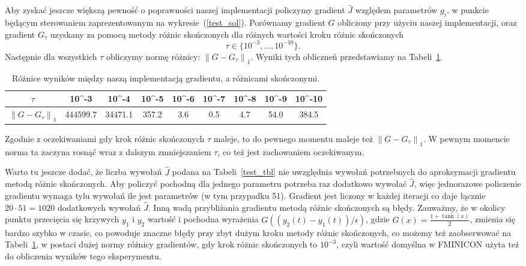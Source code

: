 \documentclass[11pt]{article}
\newcommand{\norm}[1]{\left\lVert#1\right\rVert}
\begin{document}
Aby zyskać jeszcze większą pewność o poprawności naszej implementacji policzymy gradient $\hat{J}$ względem parametrów $g_i$, w punkcie będącym sterowaniem zaprezentowanym na wykresie~(\ref{test_sol}). Porównamy gradient $G$ obliczony przy użyciu naszej implementacji, oraz gradient $G_\tau$ uzyskany za pomocą metody różnic skończonych dla różnych wartości kroku różnic skończonych
\[\tau \in \{10^{-3},\ldots,10^{-10}\}.\]
Następnie dla wszystkich $\tau$ obliczymy normę różnicy: $\norm{G - G_\tau}_1$. Wyniki tych obliczneń przedstawiamy na Tabeli~\ref{grad_fd_tbl}.

\begin{table}[h!]
  \begin{center}
    \begin{tabular}{|c|c|c|c|c|c|c|c|c|}
      \hline
      $\tau$ & 10^{-3} & 10^{-4} & 10^{-5} & 10^{-6} & 10^{-7} & 10^{-8} & 10^{-9} & 10^{-10} \\
      \hline
      $\norm{G - G_\tau}_1$ & 444599.7 & 34471.1 & 357.2 & 3.6 & 0.5 & 4.7 & 54.0 & 384.5 \\
      \hline
    \end{tabular}
    \caption{Różnice wyników między naszą implementacją gradientu, a różnicami skończonymi.}\label{grad_fd_tbl}
  \end{center}
\end{table}

Zgodnie z oczekiwaniami gdy krok różnic skończonych $\tau$ maleje, to do pewnego momentu maleje też $\norm{G - G_\tau}_1$. W pewnym momencie norma ta zaczyna rosnąć wraz z dalszym zmniejszaniem $\tau$, co też jest zachowaniem oczekiwanym.

Warto tu jeszcze dodać, że liczba wywołań $\hat{J}$ podana na Tabeli~\ref{test_tbl} nie uwzględnia wywołań potrzebnych do aproksymacji gradientu metodą różnic skończonych. Aby policzyć pochodną dla jednego parametru potrzeba raz dodatkowo wywołać $\hat{J}$, więc jednorazowe policzenie gradientu wymaga tylu wywołań ile jest parametrów (w tym przypadku 51). Gradient jest liczony w każdej iteracji co daje łącznie $20\cdot 51 = 1020$ dodatkowych wywołań $\hat{J}$. Inną wadą przybliżania gradientu metodą różnic skończonych są błędy. Zauważmy, że w okolicy punktu przecięcia się krzywych $y_1$ i $y_2$ wartość i pochodna wyrażenia $G((y_2(t) - y_1(t))/\epsilon)$, gdzie $G(x) = \frac{1 + \tanh(x)}{2}$, zmienia się bardzo szybko w czasie, co powoduje znaczne błędy przy zbyt dużym kroku metody różnic skończonych, co możemy też zaobserwować na Tabeli~\ref{grad_fd_tbl}, w postaci dużej normy różnicy gradientów, gdy krok różnic skończonych to $10^{-3}$, czyli wartość domyślna w FMINICON użyta też do obliczenia wyników tego eksperymentu.
\end{document}
